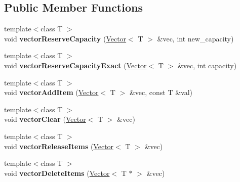 \subsection*{Public Member Functions}
\begin{DoxyCompactItemize}
\item 
{\footnotesize template$<$class T $>$ }\\void {\bfseries vector\+Reserve\+Capacity} (\hyperlink{struct_object_script_1_1_o_s_1_1_vector}{Vector}$<$ T $>$ \&vec, int new\+\_\+capacity)\hypertarget{class_object_script_1_1_o_s_aa94b8785628c970e338652406c069acd}{}\label{class_object_script_1_1_o_s_aa94b8785628c970e338652406c069acd}

\item 
{\footnotesize template$<$class T $>$ }\\void {\bfseries vector\+Reserve\+Capacity\+Exact} (\hyperlink{struct_object_script_1_1_o_s_1_1_vector}{Vector}$<$ T $>$ \&vec, int capacity)\hypertarget{class_object_script_1_1_o_s_a0d4f78dd974a0d82539892c16dcfb4ef}{}\label{class_object_script_1_1_o_s_a0d4f78dd974a0d82539892c16dcfb4ef}

\item 
{\footnotesize template$<$class T $>$ }\\void {\bfseries vector\+Add\+Item} (\hyperlink{struct_object_script_1_1_o_s_1_1_vector}{Vector}$<$ T $>$ \&vec, const T \&val)\hypertarget{class_object_script_1_1_o_s_a4e1396a5ab3086ec95d852e3e1a00ddf}{}\label{class_object_script_1_1_o_s_a4e1396a5ab3086ec95d852e3e1a00ddf}

\item 
{\footnotesize template$<$class T $>$ }\\void {\bfseries vector\+Clear} (\hyperlink{struct_object_script_1_1_o_s_1_1_vector}{Vector}$<$ T $>$ \&vec)\hypertarget{class_object_script_1_1_o_s_afc90e66a6269ddecd9976040f94ebd01}{}\label{class_object_script_1_1_o_s_afc90e66a6269ddecd9976040f94ebd01}

\item 
{\footnotesize template$<$class T $>$ }\\void {\bfseries vector\+Release\+Items} (\hyperlink{struct_object_script_1_1_o_s_1_1_vector}{Vector}$<$ T $>$ \&vec)\hypertarget{class_object_script_1_1_o_s_ae91c3ef66711cb6cd5ba21bb6bbbec88}{}\label{class_object_script_1_1_o_s_ae91c3ef66711cb6cd5ba21bb6bbbec88}

\item 
{\footnotesize template$<$class T $>$ }\\void {\bfseries vector\+Delete\+Items} (\hyperlink{struct_object_script_1_1_o_s_1_1_vector}{Vector}$<$ T $\ast$ $>$ \&vec)\hypertarget{class_object_script_1_1_o_s_ac5f0dbd2d0156b2a82c67c8928dc6057}{}\label{class_object_script_1_1_o_s_ac5f0dbd2d0156b2a82c67c8928dc6057}


\end{DoxyCompactItemize}
